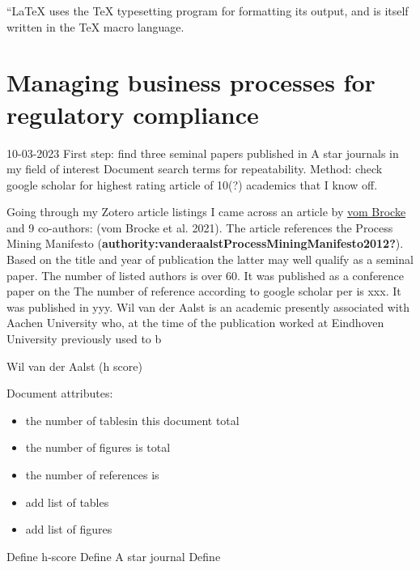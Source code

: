 \documentclass[
  letterpaper,
  DIV=11,
  numbers=noendperiod]{scrreprt}
\begin{document}
\begin{center}
``\LaTeX{} uses the \TeX{} typesetting program for formatting
its output, and is itself written in the \TeX{} macro language.
\end{center}

\hypertarget{managing-business-processes-for-regulatory-compliance}{%
\section{Managing business processes for regulatory
compliance}\label{managing-business-processes-for-regulatory-compliance}}

10-03-2023 First step: find three seminal papers published in A star
journals in my field of interest Document search terms for
repeatability. Method: check google scholar for highest rating article
of 10(?) academics that I know off.

Going through my Zotero article listings I came across an article by
\href{https://janvombrocke.com/}{vom Brocke} and 9 co-authors: (vom
Brocke et al. 2021). The article references the Process Mining Manifesto
(\textbf{authority:vanderaalstProcessMiningManifesto2012?}). Based on
the title and year of publication the latter may well qualify as a
seminal paper. The number of listed authors is over 60. It was published
as a conference paper on the The number of reference according to google
scholar per is xxx. It was published in yyy. Wil van der Aalst is an
academic presently associated with Aachen University who, at the time of
the publication worked at Eindhoven University previously used to b

Wil van der Aalst (h score)

Document attributes:

\begin{itemize}
\item
  the number of tablesin this document total
\item
  the number of figures is total
\item
  the number of references is 
\item
  add list of tables
\item
  add list of figures
\end{itemize}

Define h-score Define A star journal Define
\end{document}
